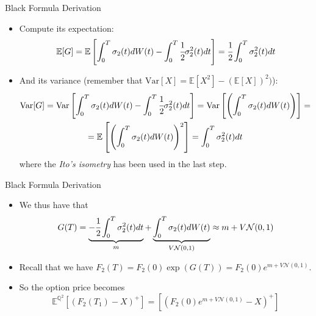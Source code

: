 \documentclass{beamer}
\begin{document}
\begin{frame}{Black Formula Derivation}
\begin{itemize}
\item Compute its expectation:
\begin{equation*}
\mathbb{E}[G] = \mathbb{E}\left[\int_0^T \sigma_2(t)dW(t) - \int_0^T  \cfrac{1}{2}\sigma^2_2(t)dt\right] = \cfrac{1}{2}\int_0^T \sigma^2_2(t)dt 
\end{equation*}
\item And its variance (remember that $\text{Var}[X]=\mathbb{E}[X^2]-(\mathbb{E}[X])^2)$):
\begin{equation*}
\begin{gathered}
\text{Var}[G] = \text{Var}\left[\int_0^T \sigma_2(t)dW(t) - \int_0^T  \cfrac{1}{2}\sigma^2_2(t)dt\right] = \text{Var}\left[\left(\int_0^T \sigma_2(t)dW(t) \right)\right] =\\
= \mathbb{E}\left[\left(\int_0^T \sigma_2(t)dW(t)\right)^2\right] = \int_0^T \sigma^2_2(t)dt
\end{gathered}
\end{equation*}
where the \emph{Ito’s isometry} has been used in the last step. 
\end{itemize}
\end{frame}

\begin{frame}{Black Formula Derivation}
\begin{itemize}
\item We thus have that
\begin{equation*}
G(T) = \underbrace{- \cfrac{1}{2}\int_0^T \sigma^2_2(t)dt}_{m} + \underbrace{\int_0^T \sigma_2(t)dW(t)}_{V\mathcal{N}(0,1)}  \approx m + V\mathcal{N}(0,1)
\end{equation*}
\item Recall that we have $F_2(T) = F_2(0) \exp(G(T)) = F_2(0)e^{m+V \mathcal{N}(0,1)}$.
\item So the option price becomes
\begin{equation*}
\mathbb{E}^{\mathbb{Q}^2}[(F_2(T_1) - X)^+] = [(F_2(0)e^{m+V \mathcal{N}(0,1)} - X)^+]
\end{equation*} 
\end{itemize}
\end{frame}
\end{document}
